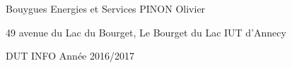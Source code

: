 \documentclass[12pt]{article}
\begin{document}
    Bouygues Energies et Services
    \hfill
    PINON Olivier

    49 avenue du Lac du Bourget, Le Bourget du Lac
    \hfill
    IUT d'Annecy
    \begin{flushright}
        DUT INFO
        Année 2016/2017
    \end{flushright}
\end{document}
